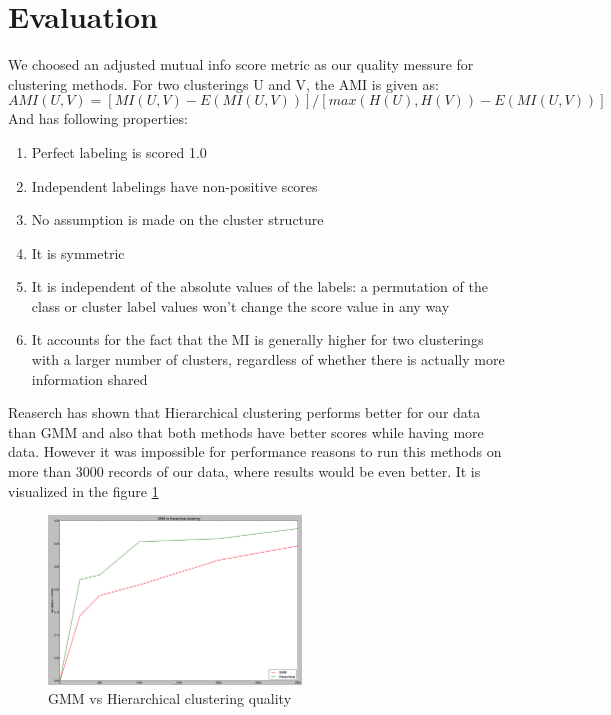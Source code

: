 \section{Evaluation}
We choosed an adjusted mutual info score metric as our quality messure for
clustering methods. For two clusterings U and V, the AMI is given as:
$$ AMI(U, V) = [MI(U, V) - E(MI(U, V))] / [max(H(U), H(V)) - E(MI(U, V))] $$
And has following properties:
\begin{enumerate}
\item Perfect labeling is scored 1.0
\item Independent labelings have non-positive scores
\item No assumption is made on the cluster structure
\item It is symmetric
\item It is independent of the absolute values of the labels: a permutation of
      the class or cluster label values won’t change the score value in any way
\item It accounts for the fact that the MI is generally higher for two
      clusterings with a larger number of clusters, regardless of whether there
      is actually more information shared
\end{enumerate}

Reaserch has shown that Hierarchical clustering performs better for our data
than GMM and also that both methods have better scores while having more data.
However it was impossible for performance reasons to run this methods on more
than 3000 records of our data, where results would be even better. It is
visualized in the figure \ref{fig:scores}
\begin{figure}[!tbh]
  \centering
  \includegraphics[width=0.6\textwidth]{figures/scores}
  \caption{GMM vs Hierarchical clustering quality}
  \label{fig:scores}
\end{figure}
